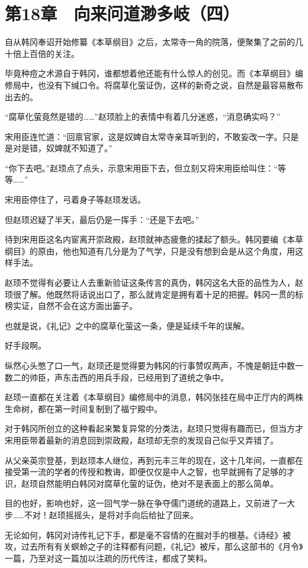 \section{第18章　向来问道渺多岐（四）}

自从韩冈奉诏开始修纂《本草纲目》之后，太常寺一角的院落，便聚集了之前的几十倍上百倍的关注。

毕竟种痘之术源自于韩冈，谁都想着他还能有什么惊人的创见。而《本草纲目》编修局中，也没有下缄口令。将腐草化萤证伪，这样的新奇之说，自然是最容易散布出去的。

“腐草化萤竟然是错的……”赵顼脸上的表情中有着几分迷惑，“消息确实吗？”

宋用臣连忙道：“回禀官家，这是奴婢自太常寺亲耳听到的，不敢妄改一字。只是是对是错，奴婢就不知道了。”

“你下去吧。”赵顼点了点头，示意宋用臣下去，但立刻又将宋用臣给叫住：“等等……”

宋用臣停住了，弓着身子等赵顼发话。

但赵顼迟疑了半天，最后仍是一挥手：“还是下去吧。”

待到宋用臣这名内宦离开崇政殿，赵顼就神态疲惫的揉起了额头。韩冈要编《本草纲目》的原由，他也知道有几分是为了气学，只是没有想到会是从这个角度，用这样手法。

赵顼不觉得有必要让人去重新验证这条传言的真伪，韩冈这名大臣的品性为人，赵顼很了解。他既然将话说出口了，那么就肯定是拥有着十足的把握。韩冈一贯的标榜实证，自然不会在这方面出篓子。

也就是说，《礼记》之中的腐草化萤这一条，便是延续千年的误解。

好手段啊。

纵然心头憋了口一气，赵顼还是觉得要为韩冈的行事赞叹两声，不愧是朝廷中数一数二的帅臣，声东击西的用兵手段，已经用到了道统之争中。

赵顼一直都在关注着《本草纲目》编修局中的消息，韩冈张挂在局中正厅内的两株生命树，都在第一时间复制到了福宁殿中。

对于韩冈所创立的这种看起来繁复异常的分类法，赵顼只觉得有趣而已，但当方才宋用臣带着最新的消息回到崇政殿，赵顼却无奈的发现自己似乎又弄错了。

从父亲英宗登基，到赵顼本人继位，再到元丰三年的现在，这十几年间，一直都在接受第一流的学者的传授和教诲，即便仅仅是中人之智，也早就拥有了足够的才识，赵顼自然能明白韩冈对腐草化萤的证伪，绝对不是表面上的那么简单。

目的也好，影响也好，这一回气学一脉在争夺儒门道统的道路上，又前进了一大步……不对！赵顼摇摇头，是将对手向后给扯了回来。

无论如何，韩冈对诗传礼记下手，都是毫不容情的在掘对手的根基。《诗经》被攻，过去所有有关螟蛉之子的注释都有问题，《礼记》被斥，那么这部书的《月令》一篇，乃至对这一篇加以注疏的历代传注，都成了笑料。

